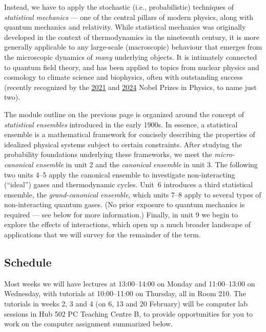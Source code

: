 Instead, we have to apply the stochastic (i.e., probabilistic) techniques of \textit{statistical mechanics} --- one of the central pillars of modern physics, along with quantum mechanics and relativity.
While statistical mechanics was originally developed in the context of thermodynamics in the nineteenth century, it is more generally applicable to any large-scale (macroscopic) behaviour that emerges from the microscopic dynamics of \emph{many} underlying objects.
It is intimately connected to quantum field theory, and has been applied to topics from nuclear physics and cosmology to climate science and biophysics, often with outstanding success (recently recognized by the \href{https://www.nobelprize.org/prizes/physics/2021/popular-information/}{2021} and \href{https://www.nobelprize.org/prizes/physics/2024/popular-information/}{2024} Nobel Prizes in Physics, to name just two).

The module outline on the previous page is organized around the concept of \textit{statistical ensembles} introduced in the early 1900s.
In essence, a statistical ensemble is a mathematical framework for concisely describing the properties of idealized physical systems subject to certain constraints.
After studying the probability foundations underlying these frameworks, we meet the \textit{micro-canonical ensemble} in unit 2 and the \textit{canonical ensemble} in unit 3.
The following two units 4--5 apply the canonical ensemble to investigate non-interacting (``ideal'') gases and thermodynamic cycles.
Unit~6 introduces a third statistical ensemble, the \textit{grand-canonical ensemble}, which units 7--8 apply to several types of non-interacting quantum gases.
(No prior exposure to quantum mechanics is required --- see below for more information.)
Finally, in unit 9 we begin to explore the effects of interactions, which open up a much broader landscape of applications that we will survey for the remainder of the term.



\subsection*{Schedule}
Most weeks we will have lectures at 13:00--14:00 on Monday and 11:00--13:00 on Wednesday, with tutorials at 10:00--11:00 on Thursday, all in Room 210.
The tutorials in weeks 2, 3 and 4 (on 6, 13 and 20 February) will be computer lab sessions in Hub 502 PC Teaching Centre B, to provide opportunities for you to work on the computer assignment summarized below.

